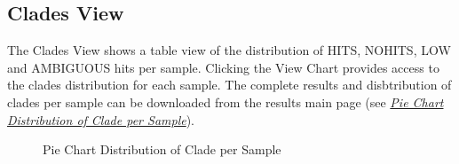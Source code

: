 \documentclass[letterpaper,10pt,english]{sphinxmanual}
\begin{document}
\subsection{Clades View}
\label{Web:clades-view}
The Clades View shows a table view of the distribution of HITS,
NOHITS, LOW and AMBIGUOUS hits per sample.  Clicking the View Chart
provides access to the clades distribution for each sample. The
complete results and disbtribution of clades per sample can be
downloaded from the results main page (see {\hyperref[Web:pie-chart]{\emph{Pie Chart Distribution of Clade per Sample}}}).
\begin{figure}[htbp]
\centering
\capstart

\caption{Pie Chart Distribution of Clade per Sample}\label{Web:pie-chart}\end{figure}
\end{document}
